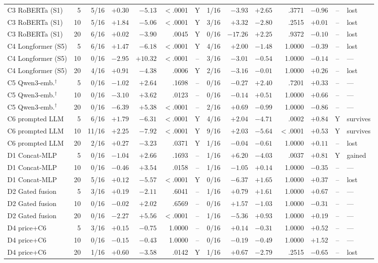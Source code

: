 \begin{table}[p]
\begin{tabular}{@{}lrrrrrcrrrrrcl@{}}
C3 RoBERTa (S1)&5&5/16&$+0.30$&$-5.13$& $<$.0001 &Y&1/16&$-3.93$&$+2.65$& .3771 &$-0.96$&--&lost\\
C3 RoBERTa (S1)&10&5/16&$+1.84$&$-5.06$& $<$.0001 &Y&3/16&$+3.32$&$-2.80$& .2515 &$+0.01$&--&lost\\
C3 RoBERTa (S1)&20&6/16&$+0.02$&$-3.90$& .0045 &Y&0/16&$-17.26$&$+2.25$& .9372 &$-0.10$&--&lost\\
\addlinespace
C4 Longformer (S5)&5&6/16&$+1.47$&$-6.18$& $<$.0001 &Y&4/16&$+2.00$&$-1.48$& 1.0000 &$-0.39$&--&lost\\
C4 Longformer (S5)&10&0/16&$-2.95$&$+10.32$& $<$.0001 &--&3/16&$-3.01$&$-0.54$& 1.0000 &$-0.14$&--&---\\
C4 Longformer (S5)&20&4/16&$+0.91$&$-4.38$& .0006 &Y&2/16&$-3.16$&$-0.01$& 1.0000 &$+0.26$&--&lost\\
\addlinespace
C5 Qwen3-emb.$^{\dagger}$&5&0/16&$-1.02$&$+2.64$& .1698 &--&0/16&$-0.27$&$+2.40$& .7201 &$+0.33$&--&---\\
C5 Qwen3-emb.$^{\dagger}$&10&0/16&$-3.10$&$+3.62$& .0123 &--&0/16&$-0.14$&$+0.51$& 1.0000 &$+0.66$&--&---\\
C5 Qwen3-emb.$^{\dagger}$&20&0/16&$-6.39$&$+5.38$& $<$.0001 &--&2/16&$+0.69$&$-0.99$& 1.0000 &$-0.86$&--&---\\
\addlinespace
C6 prompted LLM&5&6/16&$+1.79$&$-6.31$& $<$.0001 &Y&4/16&$+2.04$&$-4.71$& .0002 &$+0.84$&Y&survives\\
C6 prompted LLM&10&11/16&$+2.25$&$-7.92$& $<$.0001 &Y&9/16&$+2.03$&$-5.64$& $<$.0001 &$+0.53$&Y&survives\\
C6 prompted LLM&20&2/16&$+0.27$&$-3.23$& .0371 &Y&1/16&$-0.04$&$-0.61$& 1.0000 &$+0.11$&--&lost\\
\addlinespace
D1 Concat-MLP&5&0/16&$-1.04$&$+2.66$& .1693 &--&1/16&$+6.20$&$-4.03$& .0037 &$+0.81$&Y&gained\\
D1 Concat-MLP&10&0/16&$-0.46$&$+3.54$& .0158 &--&1/16&$-1.05$&$+0.14$& 1.0000 &$-0.35$&--&---\\
D1 Concat-MLP&20&5/16&$+0.12$&$-5.57$& $<$.0001 &Y&0/16&$-6.37$&$+1.65$& 1.0000 &$+0.37$&--&lost\\
\addlinespace
D2 Gated fusion&5&3/16&$+0.19$&$-2.11$& .6041 &--&1/16&$+0.79$&$+1.61$& 1.0000 &$+0.67$&--&---\\
D2 Gated fusion&10&0/16&$-0.02$&$+2.02$& .6569 &--&0/16&$+1.57$&$-1.03$& 1.0000 &$-0.31$&--&---\\
D2 Gated fusion&20&0/16&$-2.27$&$+5.56$& $<$.0001 &--&1/16&$-5.36$&$+0.93$& 1.0000 &$+0.19$&--&---\\
\addlinespace
D4 price+C6&5&3/16&$+0.15$&$-0.75$& 1.0000 &--&0/16&$+0.14$&$-0.31$& 1.0000 &$+0.52$&--&---\\
D4 price+C6&10&0/16&$-0.15$&$-0.43$& 1.0000 &--&0/16&$-0.19$&$-0.49$& 1.0000 &$+1.52$&--&---\\
D4 price+C6&20&1/16&$+0.60$&$-3.58$& .0142 &Y&1/16&$+0.67$&$-2.79$& .2515 &$-0.65$&--&lost\\
\bottomrule
\end{tabular}
\end{table}

